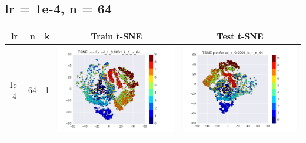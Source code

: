 \documentclass[12pt]{report}
\begin{document}
\subsection{lr = 1e-4, n = 64}

\begin{table}[H]
  \centering
  \begin{tabular}{ | c | c | c | c || c |}
    \hline
    \textbf{lr} & \textbf{n} & \textbf{k} & \textbf{Train t-SNE} & \textbf{Test t-SNE} \\ \hline
    1e-4 & 64 & 1 &
    \begin{minipage}{.3\textwidth}
      \includegraphics[scale=0.25]{cd_lr_0_0001_k_1_n_64.png}
    \end{minipage} &
    \begin{minipage}{.3\textwidth}
      \includegraphics[scale=0.25]{test_cd_lr_0_0001_k_1_n_64.png}

\end{minipage}
\end{tabular}
\end{table}
\end{document}
